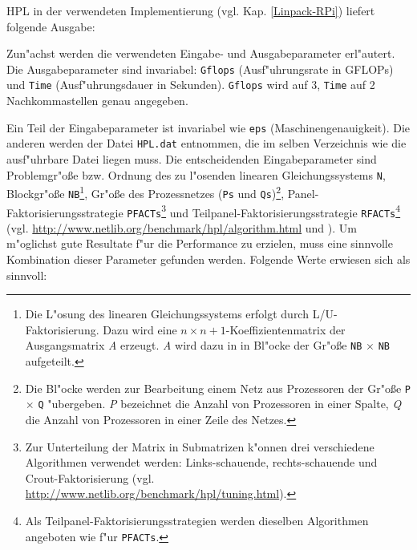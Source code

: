 HPL in der verwendeten Implementierung (vgl. Kap. \ref{Linpack-RPi}) liefert folgende Ausgabe:

Zun"achst werden die verwendeten Eingabe- und Ausgabeparameter erl"autert. Die Ausgabeparameter sind invariabel: \texttt{Gflops} (Ausf"uhrungsrate in GFLOPs) und \texttt{Time} (Ausf"uh\-rungsdauer in Sekunden). \texttt{Gflops} wird auf 3, \texttt{Time} auf 2 Nachkommastellen genau angegeben.

Ein Teil der Eingabeparameter ist invariabel wie \texttt{eps} (Maschinengenauigkeit). Die anderen werden der Datei \texttt{HPL.dat} entnommen, die im selben Verzeichnis wie die ausf"uhrbare Datei liegen muss. Die entscheidenden Eingabeparameter sind Problemgr"o\ss e bzw. Ordnung des zu l"osenden linearen Gleichungssystems \texttt{N}, Blockgr"o\ss e \texttt{NB}\footnote{Die L"osung des linearen Gleichungssystems erfolgt durch L/U-Faktorisierung. Dazu wird eine $n\times n+1$-Koeffizientenmatrix der Ausgangsmatrix \textit{A} erzeugt. \textit{A} wird dazu in in Bl"ocke der Gr"o\ss e \texttt{NB} $\times$ \texttt{NB} aufgeteilt.}, Gr"o\ss e des Prozessnetzes (\texttt{Ps} und \texttt{Qs})\footnote{Die Bl"ocke werden zur Bearbeitung einem Netz aus Prozessoren der Gr"o\ss e \texttt{P} $\times$ \texttt{Q} "ubergeben. \textit{P} bezeichnet die Anzahl von Prozessoren in einer Spalte, \textit{Q} die Anzahl von Prozessoren in einer Zeile des Netzes.}, Panel-Faktorisierungsstrategie \texttt{PFACTs}\footnote{Zur Unterteilung der Matrix in Submatrizen k"onnen drei verschiedene Algorithmen verwendet werden: Links-schauende, rechts-schauende und Crout-Faktorisierung (vgl. \url{http://www.netlib.org/benchmark/hpl/tuning.html}).} und Teilpanel-Faktorisierungsstrategie \texttt{RFACTs}\footnote{Als Teilpanel-Faktorisierungsstrategien werden dieselben Algorithmen angeboten wie f"ur \texttt{PFACTs}.} (vgl. \url{http://www.netlib.org/benchmark/hpl/algorithm.html} und \cite{pie12}). Um m"og\-lichst gute Resultate f"ur die Performance zu erzielen, muss eine sinnvolle Kombination dieser Parameter gefunden werden. Folgende Werte erwiesen sich als sinnvoll: 
